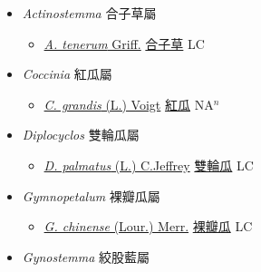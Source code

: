 
  \begin{itemize}
 \item[] \textit{Actinostemma} 合子草屬
                    
  \begin{itemize}
        \item[] \href{http://www.theplantlist.org/tpl1.1/search?q=Actinostemma+tenerum}{\textit{A. tenerum} Griff.}   \href{\detokenize{http://taibnet.sinica.edu.tw/chi/taibnet_species_list.php?T2=合子草&T2_new_value=true&fr=y}}{合子草} LC
  \end{itemize}
 \item[] \textit{Coccinia} 紅瓜屬
                    
  \begin{itemize}
        \item[] \href{http://www.theplantlist.org/tpl1.1/search?q=Coccinia+grandis}{\textit{C. grandis} (L.) Voigt}   \href{\detokenize{http://taibnet.sinica.edu.tw/chi/taibnet_species_list.php?T2=紅瓜&T2_new_value=true&fr=y}}{紅瓜} NA$^n$
  \end{itemize}
 \item[] \textit{Diplocyclos} 雙輪瓜屬
                    
  \begin{itemize}
        \item[] \href{http://www.theplantlist.org/tpl1.1/search?q=Diplocyclos+palmatus}{\textit{D. palmatus} (L.) C.Jeffrey}   \href{\detokenize{http://taibnet.sinica.edu.tw/chi/taibnet_species_list.php?T2=雙輪瓜&T2_new_value=true&fr=y}}{雙輪瓜} LC
  \end{itemize}
 \item[] \textit{Gymnopetalum} 裸瓣瓜屬
                    
  \begin{itemize}
        \item[] \href{http://www.theplantlist.org/tpl1.1/search?q=Gymnopetalum+chinense}{\textit{G. chinense} (Lour.) Merr.}   \href{\detokenize{http://taibnet.sinica.edu.tw/chi/taibnet_species_list.php?T2=裸瓣瓜&T2_new_value=true&fr=y}}{裸瓣瓜} LC
  \end{itemize}
 \item[] \textit{Gynostemma} 絞股藍屬
                    

\end{itemize}
